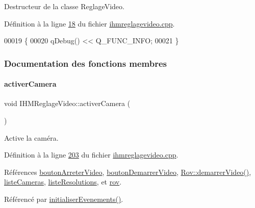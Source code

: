 Destructeur de la classe Reglage\+Video. 



Définition à la ligne \hyperlink{ihmreglagevideo_8cpp_source_l00018}{18} du fichier \hyperlink{ihmreglagevideo_8cpp_source}{ihmreglagevideo.\+cpp}.


\begin{DoxyCode}
00019 \{
00020     qDebug() << Q\_FUNC\_INFO;
00021 \}
\end{DoxyCode}


\subsubsection{Documentation des fonctions membres}
\mbox{\label{class_i_h_m_reglage_video_a7e5c5d7515a6c745dfde5c3ad3b61a66}} 
\paragraph{\texorpdfstring{activer\+Camera}{activerCamera}}
{\footnotesize\ttfamily void I\+H\+M\+Reglage\+Video\+::activer\+Camera (\begin{DoxyParamCaption}{ }\end{DoxyParamCaption})\hspace{0.3cm}{\ttfamily [slot]}}



Active la caméra. 



Définition à la ligne \hyperlink{ihmreglagevideo_8cpp_source_l00203}{203} du fichier \hyperlink{ihmreglagevideo_8cpp_source}{ihmreglagevideo.\+cpp}.



Références \hyperlink{ihmreglagevideo_8h_source_l00042}{bouton\+Arreter\+Video}, \hyperlink{ihmreglagevideo_8h_source_l00041}{bouton\+Demarrer\+Video}, \hyperlink{rov_8cpp_source_l00161}{Rov\+::demarrer\+Video()}, \hyperlink{ihmreglagevideo_8h_source_l00038}{liste\+Cameras}, \hyperlink{ihmreglagevideo_8h_source_l00040}{liste\+Resolutions}, et \hyperlink{ihmreglagevideo_8h_source_l00027}{rov}.



Référencé par \hyperlink{ihmreglagevideo_8cpp_source_l00105}{initialiser\+Evenements()}.


